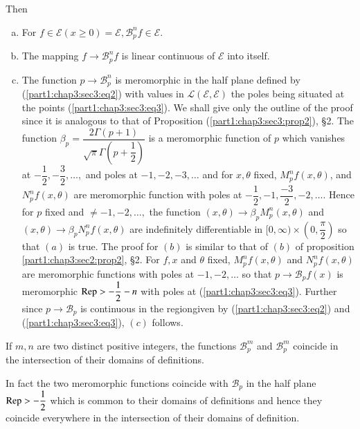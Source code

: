 Then
\begin{enumerate}[a)]
\item For $f \in \mathscr{E} (x \geq 0)= \mathscr{E}, \mathscr{B}^n _p f
  \in \mathscr{E}$. 
\item The mapping $f \to \mathscr{B}^n_p f$ is linear continuous of
  $\mathscr{E}$ into itself. 
\item The function $p \to \mathscr{B}^n _p$ is meromorphic in the half
  plane defined by (\ref{part1:chap3:sec3:eq2}) with values in
  $\mathscr{L} (\mathscr{E}, 
  \mathscr{E})$ the poles being situated at the points
  (\ref{part1:chap3:sec3:eq3}). We shall
  give only the outline of the proof since  it is analogous to that of
  Proposition (\ref{part1:chap3:sec3:prop2}), \S 2. The function $\beta _p = \dfrac{2 \Gamma
    (p+1)}{\sqrt{\pi} \Gamma (p + \dfrac{1}{2})}$ is a meromorphic
  function of $p$ which vanishes  at $- \dfrac{1}{2}, - \dfrac{3}{2},
  \ldots, $ and poles at $-1,-2,-3, \ldots$ and for $x, \theta $ fixed,
  $M^n_p f ( x, \theta )$,  and $N^n_p f (x, \theta )$ are meromorphic
  function with poles at $- \dfrac{1}{2}, -1, \dfrac{-3}{2}, -2,
  \ldots$. Hence for $p$ fixed and $\neq -1, -2, \ldots, $ the
  function $(x, \theta ) \to \beta _p M^n _p (x, \theta )$ and $(x,
  \theta ) \to \beta_p N^n _p f (x, \theta )$ are indefinitely
  differentiable in $[0, \infty) \times (0, \dfrac{\pi}{2})$ so that
  $(a)$ is true.  The proof for $(b)$ is similar to that of $(b)$ of
  proposition \ref{part1:chap3:sec2:prop2}, \S 2. For $f,x$ and
  $\theta $ fixed, $M^n_p f (x, 
  \theta )$ and $N^n_p f (x, \theta)$ are meromorphic functions with
  poles at $-1, -2, \ldots$ so that $p \to \mathscr{B}_pf (x)$ is
  meromorphic $\operatorname{Rep} > - \dfrac{1}{2}-n$ with poles at
  (\ref{part1:chap3:sec3:eq3}). Further
  since $p \to \mathscr{B}_p$ is continuous in the
  region\pageoriginale given by (\ref{part1:chap3:sec3:eq2}) and
  (\ref{part1:chap3:sec3:eq3}), $(c)$ follows. 
 \end{enumerate} 

\begin{coro*}
  If $m, n$ are two distinct positive integers, the functions
  $\mathscr{B}^m_p$ and $\mathscr{B}^m_p$ coincide in the intersection
  of their domains  of  definitions. 
\end{coro*}

In fact the two meromorphic functions coincide with $\mathscr{B}_p$
in the half plane $\operatorname{Rep} > - \dfrac{1}{2}$ which is common to their
domains of definitions and hence  they coincide everywhere in the
intersection of their domains of definition. 

